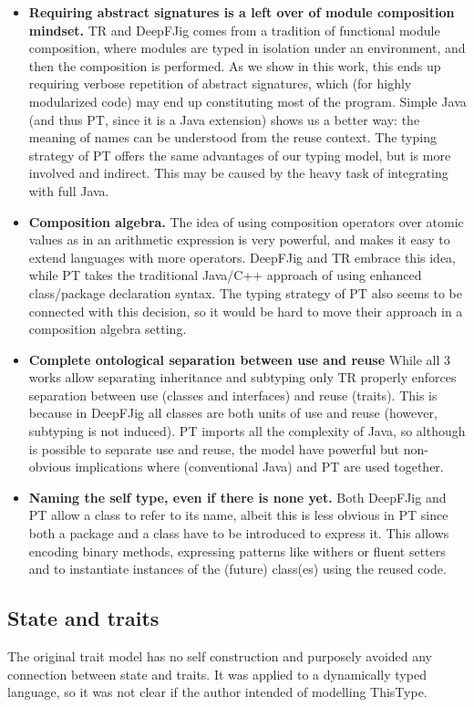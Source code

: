 \begin{itemize}
\item 
{\bf Requiring abstract signatures is a left over of module composition mindset.}
TR and DeepFJig comes from a tradition of functional module composition, where 
modules are typed in isolation under an environment, and then the composition is performed.
As we show in this work, this ends up requiring verbose repetition of abstract signatures,
which (for highly modularized code) may end up constituting most of the program.
Simple Java (and thus PT, since it is a Java extension) shows us a better way:
the meaning of names can be understood from the reuse context.
The typing strategy of PT offers the same advantages of our typing model, 
but is more involved and indirect. This may be caused by the
heavy task of integrating with full Java.
\item {\bf Composition algebra.}
The idea of using composition operators over atomic values as in an arithmetic expression is very powerful,
and makes it easy to extend languages with more operators. DeepFJig and TR embrace this idea, while PT takes the traditional Java/C++ approach of using enhanced class/package declaration syntax.
The typing strategy of PT also seems to be connected with this
decision, so it would be hard to move their approach in a composition
algebra setting.
\item {\bf Complete ontological separation between use and reuse}
While all 3 works allow separating inheritance and subtyping only TR properly enforces 
separation between use (classes and interfaces) and reuse (traits).
This is because in DeepFJig all classes are both units of use and reuse (however, subtyping is not induced).
PT imports all the complexity of Java, so although is possible to separate use and reuse, the model have powerful but non-obvious implications where (conventional Java) \Q@extends@ and PT are used together.
\item {\bf Naming the self type, even if there is none yet.}
Both DeepFJig and PT allow a class to refer to its name, albeit this is
less obvious in PT since both a package and a class have to be introduced to express it.
This allows encoding binary methods, expressing patterns like withers or fluent setters and to instantiate instances of the (future) class(es)  using the reused code.

\end{itemize}

\subsection{State and traits}
The original trait model has no self construction 
and purposely avoided any connection between state and traits.
It was applied to a dynamically typed language, so
it was not clear if the author intended of modelling ThisType.


